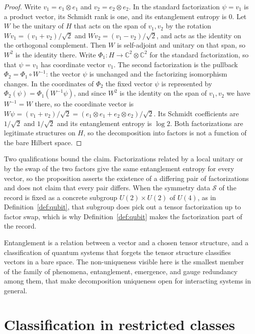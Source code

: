 \documentclass[11pt,letterpaper]{article}
\theoremstyle{definition}
\theoremstyle{remark}
\begin{document}
\begin{proof}
Write $v_1 = e_1 \otimes e_1$ and $v_2 = e_2 \otimes e_2$. In the standard factorization $\psi = v_1$ is a product vector, its Schmidt rank is one, and its entanglement entropy is $0$. Let $W$ be the unitary of $H$ that acts on the span of $v_1, v_2$ by the rotation $W v_1 = (v_1 + v_2)/\sqrt{2}$ and $W v_2 = (v_1 - v_2)/\sqrt{2}$, and acts as the identity on the orthogonal complement. Then $W$ is self-adjoint and unitary on that span, so $W^2$ is the identity there. Write $\Phi_1 \colon H \to \mathbb{C}^2 \otimes \mathbb{C}^2$ for the standard factorization, so that $\psi = v_1$ has coordinate vector $v_1$. The second factorization is the pullback $\Phi_2 = \Phi_1 \circ W^{-1}$: the vector $\psi$ is unchanged and the factorizing isomorphism changes. In the coordinates of $\Phi_2$ the fixed vector $\psi$ is represented by $\Phi_2(\psi) = \Phi_1(W^{-1} \psi)$, and since $W^2$ is the identity on the span of $v_1, v_2$ we have $W^{-1} = W$ there, so the coordinate vector is $W \psi = (v_1 + v_2)/\sqrt{2} = (e_1 \otimes e_1 + e_2 \otimes e_2)/\sqrt{2}$. Its Schmidt coefficients are $1/\sqrt{2}$ and $1/\sqrt{2}$ and its entanglement entropy is $\log 2$. Both factorizations are legitimate structures on $H$, so the decomposition into factors is not a function of the bare Hilbert space.
\end{proof}

Two qualifications bound the claim. Factorizations related by a local unitary or by the swap of the two factors give the same entanglement entropy for every vector, so the proposition asserts the existence of a differing pair of factorizations and does not claim that every pair differs. When the symmetry data $\mathcal{S}$ of the record is fixed as a concrete subgroup $U(2) \times U(2)$ of $U(4)$, as in Definition~\ref{def:qubit}, that subgroup does pick out a tensor factorization up to factor swap, which is why Definition~\ref{def:qubit} makes the factorization part of the record.

Entanglement is a relation between a vector and a chosen tensor structure, and a classification of quantum systems that forgets the tensor structure classifies vectors in a bare space. The non-uniqueness visible here is the smallest member of the family of phenomena, entanglement, emergence, and gauge redundancy among them, that make decomposition uniqueness open for interacting systems in general.

\section{Classification in restricted classes}
\label{sec:restricted}
\end{document}
